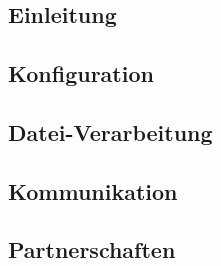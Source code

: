 \chapter{\sblitg}
\renewcommand{\kapitelautor}{Autor: Nikola Szucsich}
\section{Einleitung} \label{Einleitung}


\section{Konfiguration} \label{Konfiguration}


\section{Datei-Verarbeitung} \label{Dateiverarbeitung}


\section{Kommunikation} \label{Kommunikation}


\section{Partnerschaften} \label{Partnerschaften}

